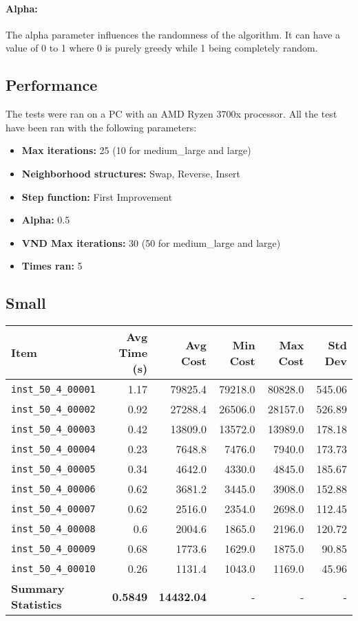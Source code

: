 \documentclass{article}
\begin{document}
\paragraph{Alpha:}
The alpha parameter influences the randomness of the algorithm. It can have a value of 0 to 1 where 0 is purely greedy while 1 being completely random.

\subsection*{Performance}
The tests were ran on a PC with an AMD Ryzen 3700x processor. All the test have been ran with the following parameters: 
\begin{itemize}
	\item \textbf{Max iterations:} 25 (10 for medium\_large and large)
	\item \textbf{Neighborhood structures:} Swap, Reverse, Insert
	\item \textbf{Step function:} First Improvement
	\item \textbf{Alpha:} 0.5
	\item \textbf{VND Max iterations:} 30 (50 for medium\_large and large)
	\item \textbf{Times ran:} 5
\end{itemize}

\subsection*{Small}
\begin{table}[H]
	\centering
	\begin{tabular}{lrrrrr}
		\toprule
		\textbf{Item} & \textbf{Avg Time (s)} & \textbf{Avg Cost} & \textbf{Min Cost} & \textbf{Max Cost} & \textbf{Std Dev} \\
		\midrule
		\texttt{inst\_50\_4\_00001} & 1.17 & 79825.4 & 79218.0 & 80828.0 & 545.06 \\ 
		\texttt{inst\_50\_4\_00002} & 0.92 & 27288.4 & 26506.0 & 28157.0 & 526.89 \\ 
		\texttt{inst\_50\_4\_00003} & 0.42 & 13809.0 & 13572.0 & 13989.0 & 178.18 \\ 
		\texttt{inst\_50\_4\_00004} & 0.23 & 7648.8 & 7476.0 & 7940.0 & 173.73 \\ 
		\texttt{inst\_50\_4\_00005} & 0.34 & 4642.0 & 4330.0 & 4845.0 & 185.67 \\ 
		\texttt{inst\_50\_4\_00006} & 0.62 & 3681.2 & 3445.0 & 3908.0 & 152.88 \\ 
		\texttt{inst\_50\_4\_00007} & 0.62 & 2516.0 & 2354.0 & 2698.0 & 112.45 \\ 
		\texttt{inst\_50\_4\_00008} & 0.6 & 2004.6 & 1865.0 & 2196.0 & 120.72 \\ 
		\texttt{inst\_50\_4\_00009} & 0.68 & 1773.6 & 1629.0 & 1875.0 & 90.85 \\ 
		\texttt{inst\_50\_4\_00010} & 0.26 & 1131.4 & 1043.0 & 1169.0 & 45.96 \\
		\midrule
		\textbf{Summary Statistics} & \textbf{0.5849} & \textbf{14432.04} & - & - & - \\
		\bottomrule
	\end{tabular}
	\label{tab:performance_metrics_small_grasp}
\end{table}
\end{document}
